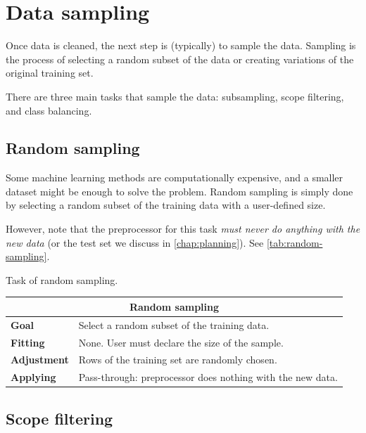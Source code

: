 \section{Data sampling}

Once data is cleaned, the next step is (typically) to sample the data.  Sampling is the
process of selecting a random subset of the data or creating variations of the original
training set.

There are three main tasks that sample the data: subsampling, scope filtering, and class
balancing.

\subsection{Random sampling}
\label{sub:random-sampling}

Some machine learning methods are computationally expensive, and a smaller dataset might be
enough to solve the problem.  Random sampling is simply done by selecting a random subset
of the training data with a user-defined size.

However, note that the \gls{preprocessor} for this task \emph{must never do anything with the
new data} (or the test set we discuss in \cref{chap:planning}).  See
\cref{tab:random-sampling}.

\begin{tablebox}[label=tab:random-sampling]{Task of random sampling.}
  \centering
  \begin{tabular}{lp{6cm}}
    \toprule
    \multicolumn{2}{c}{\textbf{Random sampling}} \\
    \midrule
    \textbf{Goal} &
      Select a random subset of the training data. \\
    \textbf{Fitting} &
      None. User must declare the size of the sample. \\
    \textbf{Adjustment} &
      Rows of the training set are randomly chosen. \\
    \textbf{Applying} &
      Pass-through: \gls{preprocessor} does nothing with the new data. \\
    \bottomrule
  \end{tabular}
\end{tablebox}

\subsection{Scope filtering}

